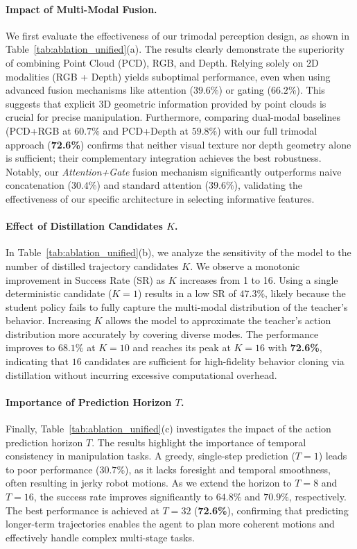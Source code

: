\paragraph{Impact of Multi-Modal Fusion.}
We first evaluate the effectiveness of our trimodal perception design, as shown in Table~\ref{tab:ablation_unified}(a).
The results clearly demonstrate the superiority of combining Point Cloud (PCD), RGB, and Depth.
Relying solely on 2D modalities (RGB + Depth) yields suboptimal performance, even when using advanced fusion mechanisms like attention ($39.6\%$) or gating ($66.2\%$). This suggests that explicit 3D geometric information provided by point clouds is crucial for precise manipulation.
Furthermore, comparing dual-modal baselines (PCD+RGB at $60.7\%$ and PCD+Depth at $59.8\%$) with our full trimodal approach (\textbf{72.6\%}) confirms that neither visual texture nor depth geometry alone is sufficient; their complementary integration achieves the best robustness.
Notably, our \textit{Attention+Gate} fusion mechanism significantly outperforms naive concatenation ($30.4\%$) and standard attention ($39.6\%$), validating the effectiveness of our specific architecture in selecting informative features.

\paragraph{Effect of Distillation Candidates $K$.}
In Table~\ref{tab:ablation_unified}(b), we analyze the sensitivity of the model to the number of distilled trajectory candidates $K$.
We observe a monotonic improvement in Success Rate (SR) as $K$ increases from 1 to 16.
Using a single deterministic candidate ($K=1$) results in a low SR of $47.3\%$, likely because the student policy fails to fully capture the multi-modal distribution of the teacher's behavior.
Increasing $K$ allows the model to approximate the teacher's action distribution more accurately by covering diverse modes.
The performance improves to $68.1\%$ at $K=10$ and reaches its peak at $K=16$ with \textbf{72.6\%}, indicating that $16$ candidates are sufficient for high-fidelity behavior cloning via distillation without incurring excessive computational overhead.

\paragraph{Importance of Prediction Horizon $T$.}
Finally, Table~\ref{tab:ablation_unified}(c) investigates the impact of the action prediction horizon $T$.
The results highlight the importance of temporal consistency in manipulation tasks.
A greedy, single-step prediction ($T=1$) leads to poor performance ($30.7\%$), as it lacks foresight and temporal smoothness, often resulting in jerky robot motions.
As we extend the horizon to $T=8$ and $T=16$, the success rate improves significantly to $64.8\%$ and $70.9\%$, respectively.
The best performance is achieved at $T=32$ (\textbf{72.6\%}), confirming that predicting longer-term trajectories enables the agent to plan more coherent motions and effectively handle complex multi-stage tasks.


